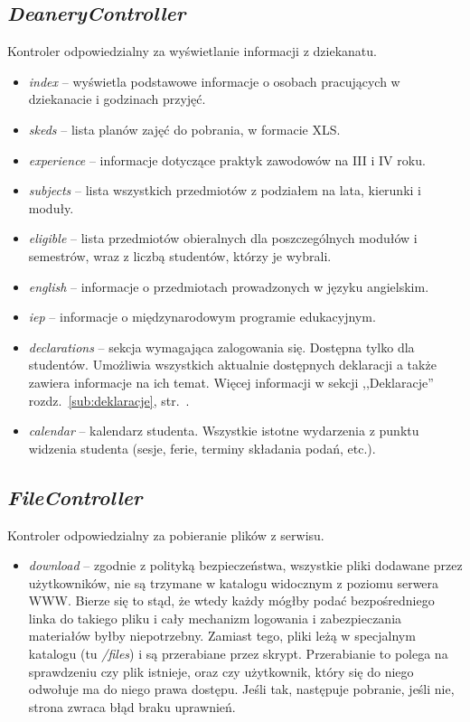 \documentclass[a4paper,12pt,oneside]{report}
\begin{document}
\subsection{\emph{DeaneryController}}
\label{con:deanery}
  Kontroler odpowiedzialny za wyświetlanie informacji z dziekanatu.
\begin{itemize}
  \item \emph{index} -- wyświetla podstawowe informacje o osobach pracujących w dziekanacie i godzinach przyjęć.
  \item \emph{skeds} -- lista planów zajęć do pobrania, w formacie XLS.
  \item \emph{experience} -- informacje dotyczące praktyk zawodowów na III i IV roku.
  \item \emph{subjects} -- lista wszystkich przedmiotów z podziałem na lata, kierunki i moduły. 
  \item \emph{eligible} -- lista przedmiotów obieralnych dla poszczególnych modułów i semestrów, wraz z liczbą studentów, którzy je wybrali.
  \item \emph{english} -- informacje o przedmiotach prowadzonych w języku angielskim.
  \item \emph{iep} -- informacje o międzynarodowym programie edukacyjnym.
  \item \emph{declarations} -- sekcja wymagająca zalogowania się. Dostępna tylko dla studentów. Umożliwia wszystkich aktualnie dostępnych deklaracji a także zawiera informacje na ich temat. Więcej informacji w sekcji ,,Deklaracje'' rozdz.~\ref{sub:deklaracje}, str.~\pageref{sub:deklaracje}.
  \item \emph{calendar} -- kalendarz studenta. Wszystkie istotne wydarzenia z punktu widzenia studenta (sesje, ferie, terminy składania podań, etc.).
\end{itemize}

\subsection{\emph{FileController}}
\label{con:file}
  Kontroler odpowiedzialny za pobieranie plików z serwisu.
\begin{itemize}
  \item \emph{download} -- zgodnie z polityką bezpieczeństwa, wszystkie pliki dodawane przez użytkowników, nie są trzymane w katalogu widocznym z poziomu serwera WWW. Bierze się to stąd, że wtedy każdy mógłby podać bezpośredniego linka do takiego pliku i cały mechanizm logowania i zabezpieczania materiałów byłby niepotrzebny. Zamiast tego, pliki leżą w specjalnym katalogu (tu \emph{/files}) i są przerabiane przez skrypt. Przerabianie to polega na sprawdzeniu czy plik istnieje, oraz czy użytkownik, który się do niego odwołuje ma do niego prawa dostępu. Jeśli tak, następuje pobranie, jeśli nie, strona zwraca błąd braku uprawnień.
\end{itemize}
\end{document}
